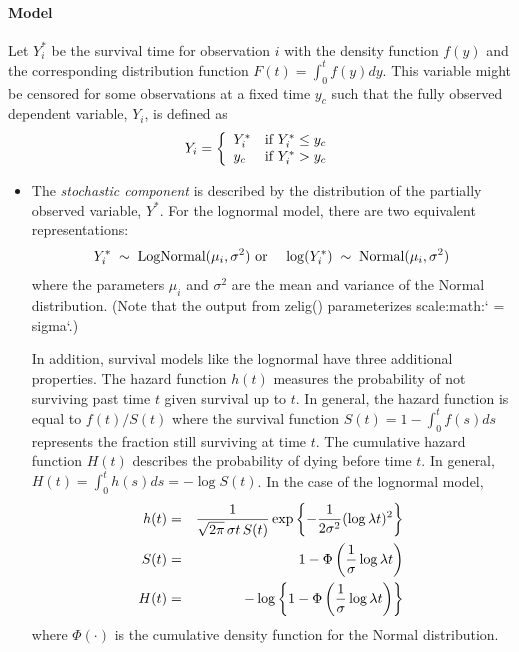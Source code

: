 \documentclass[letterpaper,10pt,english]{sphinxmanual}
\begin{document}
\paragraph{Model}
\label{zelig-lognorm:model}
Let \(Y_i^*\) be the survival time for observation \(i\) with
the density function \(f(y)\) and the corresponding distribution
function \(F(t)=\int_{0}^t f(y) dy\). This variable might be
censored for some observations at a fixed time \(y_c\) such that the
fully observed dependent variable, \(Y_i\), is defined as
\begin{gather}
\begin{split}Y_i = \left\{ \begin{array}{ll}
      Y_i^* & \textrm{if }Y_i^* \leq y_c \\
      y_c & \textrm{if }Y_i^* > y_c \\
    \end{array} \right.\end{split}\notag
\end{gather}\begin{itemize}
\item {} 
The \emph{stochastic component} is described by the distribution of the
partially observed variable, \(Y^*\). For the lognormal model,
there are two equivalent representations:
\begin{gather}
\begin{split}\begin{aligned}
    Y_i^* \; \sim \; \textrm{LogNormal}(\mu_i, \sigma^2) & \textrm{ or
} & \log(Y_i^*) \; \sim \; \textrm{Normal}(\mu_i, \sigma^2)\end{aligned}\end{split}\notag
\end{gather}
where the parameters \(\mu_i\) and \(\sigma^2\) are the mean
and variance of the Normal distribution. (Note that the output from
zelig() parameterizes scale:math:{}` = sigma{}`.)

In addition, survival models like the lognormal have three additional
properties. The hazard function \(h(t)\) measures the probability
of not surviving past time \(t\) given survival up to \(t\).
In general, the hazard function is equal to \(f(t)/S(t)\) where
the survival function \(S(t) =1 - \int_{0}^t f(s) ds\) represents the fraction still surviving at
time \(t\). The cumulative hazard function \(H(t)\) describes
the probability of dying before time \(t\). In general,
\(H(t)=
\int_{0}^{t} h(s) ds = -\log S(t)\). In the case of the lognormal
model,
\begin{gather}
\begin{split}\begin{aligned}
h(t) &=& \frac{1}{\sqrt{2 \pi} \, \sigma t \, S(t)}
\exp\left\{-\frac{1}{2 \sigma^2} (\log \lambda t)^2\right\} \\
S(t) &=& 1 - \Phi\left(\frac{1}{\sigma} \log \lambda t\right) \\
H(t) &=& -\log \left\{ 1 - \Phi\left(\frac{1}{\sigma} \log \lambda t\right) \right\}\end{aligned}\end{split}\notag
\end{gather}
where \(\Phi(\cdot)\) is the cumulative density function for the
Normal distribution.


\end{itemize}
\end{document}
